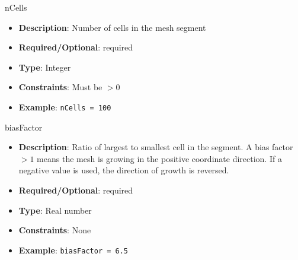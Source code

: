 nCells
\vspace{\the\parameterListSpacing}
\begin{itemize}
    \item {\bf Description}: Number of cells in the mesh segment
    \item {\bf Required/Optional}: required
    \item {\bf Type}: Integer
    \item {\bf Constraints}: Must be $>0$
    \item {\bf Example}: \lstinline!nCells = 100!
\end{itemize}

biasFactor
\vspace{\the\parameterListSpacing}
\begin{itemize}
    \item {\bf Description}: Ratio of largest to smallest cell in the segment. A bias factor $>1$ means the mesh is growing in the positive coordinate direction. If a negative value is used, the direction of growth is reversed.
    \item {\bf Required/Optional}: required
    \item {\bf Type}: Real number
    \item {\bf Constraints}: None
    \item {\bf Example}: \lstinline!biasFactor = 6.5!
\end{itemize}
